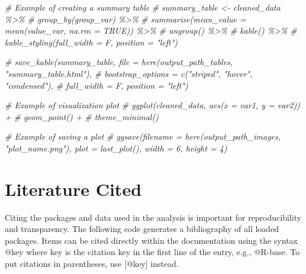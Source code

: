 \documentclass[
]{article}
\newenvironment{Shaded}{\begin{snugshade}}{\end{snugshade}}
\newcommand{\CommentTok}[1]{\textcolor[rgb]{0.56,0.35,0.01}{\textit{#1}}}
\begin{document}
\begin{Shaded}
\begin{Highlighting}[]
\CommentTok{\# Example of creating a summary table }
\CommentTok{\# summary\_table \textless{}{-} cleaned\_data \%\textgreater{}\%}
\CommentTok{\#   group\_by(group\_var) \%\textgreater{}\%}
\CommentTok{\#   summarise(mean\_value = mean(value\_var, na.rm = TRUE)) \%\textgreater{}\%}
\CommentTok{\#   ungroup() \%\textgreater{}\%}
\CommentTok{\#   kable() \%\textgreater{}\%}
\CommentTok{\#   kable\_styling(full\_width = F, position = "left") }

\CommentTok{\# save\_kable(summary\_table, file = here(output\_path\_tables, "summary\_table.html"),}
\CommentTok{\#   bootstrap\_options = c("striped", "hover", "condensed"),}
\CommentTok{\#   full\_width = F, position = "left")}
\end{Highlighting}
\end{Shaded}

\begin{Shaded}
\begin{Highlighting}[]
\CommentTok{\# Example of visualization plot}
\CommentTok{\# ggplot(cleaned\_data, aes(x = var1, y = var2)) +}
\CommentTok{\#   geom\_point() +}
\CommentTok{\#   theme\_minimal()}

\CommentTok{\# Example of saving a plot}
\CommentTok{\# ggsave(filename = here(output\_path\_images, "plot\_name.png"), plot = last\_plot(), width = 6, height = 4)}
\end{Highlighting}
\end{Shaded}

\section{Literature Cited}\label{literature-cited}

Citing the packages and data used in the analysis is important for
reproducibility and transparency. The following code generates a
bibliography of all loaded packages. Items can be cited directly within
the documentation using the syntax @key where key is the citation key in
the first line of the entry, e.g., @R-base. To put citations in
parentheses, use {[}@key{]} instead.
\end{document}
